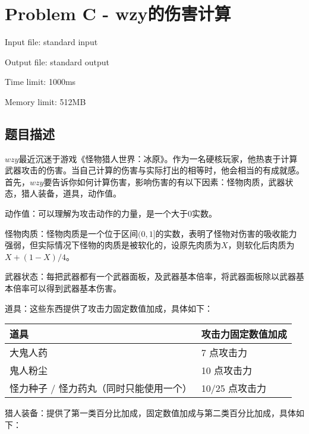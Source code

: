 \newpage
\section{Problem C - wzy的伤害计算}
{ \limitfont{}
Input file: standard input \par
Output file: standard output \par
Time limit: 1000ms \par
Memory limit: 512MB \par
}
\subsection*{题目描述}

$wzy$最近沉迷于游戏《怪物猎人世界：冰原》。作为一名硬核玩家，他热衷于计算武器攻击的伤害。当自己计算的伤害与实际打出的相等时，他会相当的有成就感。
​首先，$wzy$要告诉你如何计算伤害，影响伤害的有以下因素：怪物肉质，武器状态，猎人装备，道具，动作值。

​动作值：可以理解为攻击动作的力量，是一个大于$0$实数。

怪物肉质：怪物肉质是一个位于区间$(0,1]$的实数，表明了怪物对伤害的吸收能力强弱，但实际情况下怪物的肉质是被软化的，设原先肉质为$X$，则软化后肉质为$X+(1-X)/4$。

​武器状态：每把武器都有一个武器面板，及武器基本倍率，将武器面板除以武器基本倍率可以得到武器基本伤害。

​道具：这些东西提供了攻击力固定数值加成，具体如下：

\begin{table}[H]
    \begin{tabularx}{\textwidth}{|X|X|}
    \hline
    \textbf{道具} & \textbf{攻击力固定数值加成} \\
    \hline
    {大鬼人药}         & {7 点攻击力} \\ \hline
    {鬼人粉尘}                  & {10 点攻击力}         \\ \hline
    {怪力种子 / 怪力药丸（同时只能使用一个）} & {10/25 点攻击力}      \\ \hline
    \end{tabularx}
\end{table}

​猎人装备：提供了第一类百分比加成，固定数值加成与第二类百分比加成，具体如下：

